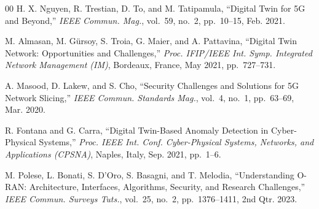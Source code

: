 \documentclass[conference]{IEEEtran}
\begin{document}
\begin{thebibliography}{00}
H. X. Nguyen, R. Trestian, D. To, and M. Tatipamula,
``Digital Twin for 5G and Beyond,''
\emph{IEEE Commun. Mag.},
vol.~59, no.~2, pp.~10--15, Feb. 2021.

M. Almasan, M. Gürsoy, S. Troia, G. Maier, and A. Pattavina,
``Digital Twin Network: Opportunities and Challenges,''
\emph{Proc. IFIP/IEEE Int. Symp. Integrated Network Management (IM)},
Bordeaux, France, May 2021, pp.~727--731.

A. Masood, D. Lakew, and S. Cho,
``Security Challenges and Solutions for 5G Network Slicing,''
\emph{IEEE Commun. Standards Mag.},
vol.~4, no.~1, pp.~63--69, Mar. 2020.

R. Fontana and G. Carra,
``Digital Twin-Based Anomaly Detection in Cyber-Physical Systems,''
\emph{Proc. IEEE Int. Conf. Cyber-Physical Systems, Networks, and
Applications (CPSNA)},
Naples, Italy, Sep. 2021, pp.~1--6.

M. Polese, L. Bonati, S. D'Oro, S. Basagni, and T. Melodia,
``Understanding O-RAN: Architecture, Interfaces, Algorithms, Security,
and Research Challenges,''
\emph{IEEE Commun. Surveys Tuts.},
vol.~25, no.~2, pp.~1376--1411, 2nd Qtr. 2023.

\end{thebibliography}
\end{document}
